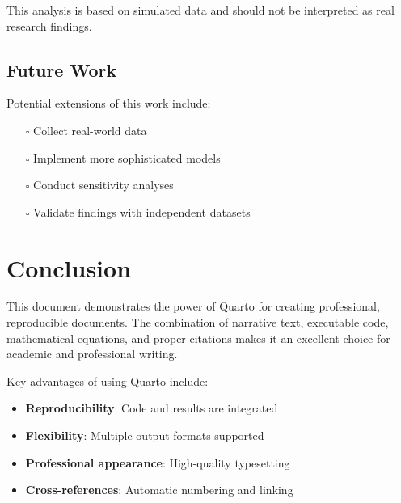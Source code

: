\documentclass[
  11pt,
]{article}
\providecommand{\tightlist}{%
  \setlength{\itemsep}{0pt}\setlength{\parskip}{0pt}}
\begin{document}
\begin{tcolorbox}[enhanced jigsaw, bottomtitle=1mm, colframe=quarto-callout-warning-color-frame, opacityback=0, leftrule=.75mm, opacitybacktitle=0.6, bottomrule=.15mm, colback=white, toptitle=1mm, colbacktitle=quarto-callout-warning-color!10!white, breakable, coltitle=black, left=2mm, title=\textcolor{quarto-callout-warning-color}{\faExclamationTriangle}\hspace{0.5em}{Limitation}, arc=.35mm, toprule=.15mm, rightrule=.15mm, titlerule=0mm]

This analysis is based on simulated data and should not be interpreted
as real research findings.

\end{tcolorbox}

\subsection{Future Work}\label{future-work}

Potential extensions of this work include:

\begin{itemize}
\tightlist
\item[$\square$]
  Collect real-world data
\item[$\square$]
  Implement more sophisticated models
\item[$\square$]
  Conduct sensitivity analyses
\item[$\square$]
  Validate findings with independent datasets
\end{itemize}

\section{Conclusion}\label{sec-conclusion}

This document demonstrates the power of Quarto for creating
professional, reproducible documents. The combination of narrative text,
executable code, mathematical equations, and proper citations makes it
an excellent choice for academic and professional writing.

Key advantages of using Quarto include:

\begin{itemize}
\tightlist
\item
  \textbf{Reproducibility}: Code and results are integrated
\item
  \textbf{Flexibility}: Multiple output formats supported
\item
  \textbf{Professional appearance}: High-quality typesetting
\item
  \textbf{Cross-references}: Automatic numbering and linking
\end{itemize}


\printbibliography[title=References]
\end{document}
